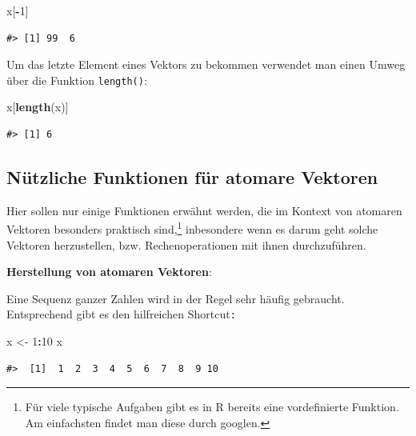 \documentclass[]{book}
\newenvironment{Shaded}{\begin{snugshade}}{\end{snugshade}}
\newcommand{\KeywordTok}[1]{\textcolor[rgb]{0.13,0.29,0.53}{\textbf{#1}}}
\newcommand{\DecValTok}[1]{\textcolor[rgb]{0.00,0.00,0.81}{#1}}
\newcommand{\StringTok}[1]{\textcolor[rgb]{0.31,0.60,0.02}{#1}}
\newcommand{\OperatorTok}[1]{\textcolor[rgb]{0.81,0.36,0.00}{\textbf{#1}}}
\newcommand{\NormalTok}[1]{#1}
\let\rmarkdownfootnote\footnote%
\def\footnote{\protect\rmarkdownfootnote}
\begin{document}
\begin{Shaded}
\begin{Highlighting}[]
\NormalTok{x[}\OperatorTok{-}\DecValTok{1}\NormalTok{]}
\end{Highlighting}
\end{Shaded}

\begin{verbatim}
#> [1] 99  6
\end{verbatim}

Um das letzte Element eines Vektors zu bekommen verwendet man einen
Umweg über die Funktion \texttt{length()}:

\begin{Shaded}
\begin{Highlighting}[]
\NormalTok{x[}\KeywordTok{length}\NormalTok{(x)]}
\end{Highlighting}
\end{Shaded}

\begin{verbatim}
#> [1] 6
\end{verbatim}

\subsection{Nützliche Funktionen für atomare
Vektoren}\label{nutzliche-funktionen-fur-atomare-vektoren}

Hier sollen nur einige Funktionen erwähnt werden, die im Kontext von
atomaren Vektoren besonders praktisch sind,\footnote{Für viele typische
  Aufgaben gibt es in R bereits eine vordefinierte Funktion. Am
  einfachsten findet man diese durch googlen.} inbesondere wenn es darum
geht solche Vektoren herzustellen, bzw. Rechenoperationen mit ihnen
durchzuführen.

\textbf{Herstellung von atomaren Vektoren}:

Eine Sequenz ganzer Zahlen wird in der Regel sehr häufig gebraucht.
Entsprechend gibt es den hilfreichen Shortcut\texttt{:}

\begin{Shaded}
\begin{Highlighting}[]
\NormalTok{x <-}\StringTok{ }\DecValTok{1}\OperatorTok{:}\DecValTok{10}
\NormalTok{x}
\end{Highlighting}
\end{Shaded}

\begin{verbatim}
#>  [1]  1  2  3  4  5  6  7  8  9 10
\end{verbatim}
\end{document}
